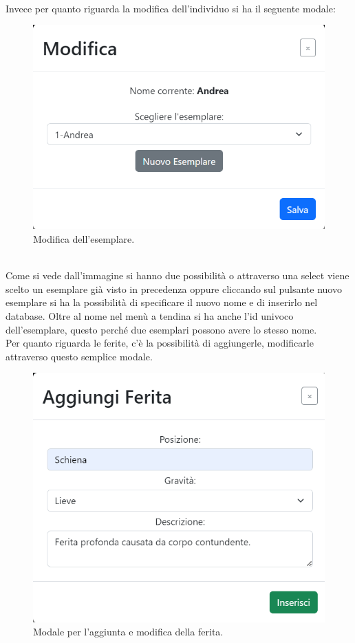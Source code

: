 \documentclass[a4paper,final,12pt]{report}
\begin{document}
\\Invece per quanto riguarda la modifica dell'individuo si ha il seguente modale:
\begin{figure}[hbtp]
\centering
\includegraphics[scale=0.51]{img_concettuale/modificaNome.png}
\caption{Modifica dell'esemplare.}
\end{figure}
\\Come si vede dall'immagine si hanno due possibilità o attraverso una select viene scelto un esemplare già visto in precedenza oppure cliccando sul pulsante nuovo esemplare si ha la possibilità di specificare il nuovo nome e di inserirlo nel database. Oltre al nome nel menù a tendina si ha anche l'id univoco dell'esemplare, questo perché due esemplari possono avere lo stesso nome.\\
Per quanto riguarda le ferite, c'è la possibilità di aggiungerle, modificarle attraverso questo semplice modale.
\begin{figure}[hbtp]
\centering
\includegraphics[scale=0.60]{img_concettuale/ferita.png}
\caption{Modale per l'aggiunta e modifica della ferita.}
\end{figure}
\end{document}
